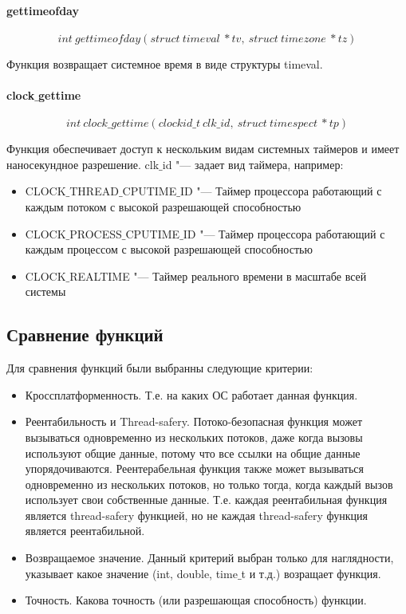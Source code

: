 \documentclass{article}
\begin{document}
			\paragraph*{gettimeofday}
			$$int~gettimeofday(struct~timeval~*tv,~struct~timezone~*tz)$$ 
			
				Функция возвращает системное время в виде структуры timeval.
			\paragraph*{clock$\_$gettime}
			$$int~clock\_gettime(clockid\_t~clk\_id,~struct~timespect~*tp)$$
			
				Функция обеспечивает доступ к нескольким видам системных таймеров и имеет наносекундное разрешение. 
			clk$\_$id  "--- задает вид таймера, например:
			\begin{itemize}
				\item CLOCK$\_$THREAD$\_$CPUTIME$\_$ID "---	Таймер процессора работающий с каждым потоком с высокой разрешающей 						способностью		
				\item CLOCK$\_$PROCESS$\_$CPUTIME$\_$ID "---	Таймер процессора работающий с каждым процессом с высокой 								разрешающей способностью
				\item CLOCK$\_$REALTIME "--- Таймер реального времени в масштабе всей системы
			\end{itemize}	

			\subsection{Сравнение функций}			
			
			Для сравнения функций были выбранны следующие критерии:
			\begin{itemize}
				\item Кроссплатформенность. Т.е. на каких ОС работает данная функция.
				\item Реентабильность и Thread-safery. Потоко-безопасная функция может вызываться одновременно из нескольких 							потоков, даже когда вызовы используют общие данные, потому что все ссылки на общие данные упорядочиваются.
					Реентерабельная функция также может вызываться одновременно из нескольких потоков, но только тогда, когда 							каждый вызов использует свои собственные данные. Т.е. каждая реентабильная функция является thread-safery 							функцией, но не каждая thread-safery функция является реентабильной.
				\item Возвращаемое значение. Данный критерий выбран только для наглядности, указывает какое значение (int, 								double, time$\_$t и т.д.) возращает функция.
				\item Точность. Какова точность (или разрешающая способность) функции.
			\end{itemize}
			
\end{document}

